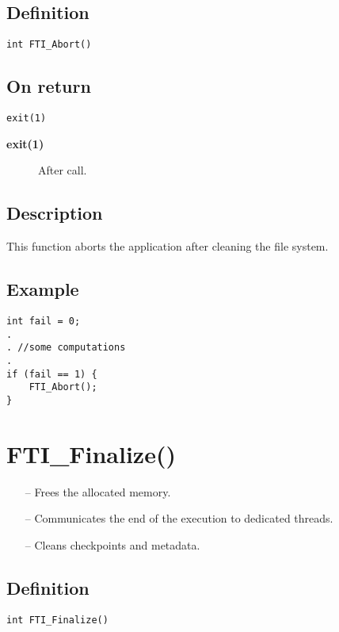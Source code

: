 \documentclass{refrep}
\begin{document}
\subsection*{Definition}
\begin{lstlisting}[frame=single]
int FTI_Abort()
\end{lstlisting}
\subsection*{On return}
\begin{lstlisting}[frame=single]
exit(1)
\end{lstlisting}
\begin{description}
\item[\textbf{exit(1)}] After call.
\end{description}
\subsection*{Description}
This function aborts the application after cleaning the file system.
\subsection*{Example}
\begin{center}
\begin{lstlisting}[frame=single]
int fail = 0;
.
. //some computations
.
if (fail == 1) {
    FTI_Abort();
}
\end{lstlisting}
\end{center}
\newpage
\section{\asciifamily FTI\_Finalize()}\label{sec:ftifinalize}
\begin{framed}
\begin{itemize}
\item[--] Frees the allocated memory.
\item[--] Communicates the end of the execution to dedicated threads.
\item[--] Cleans checkpoints and metadata.
\end{itemize}
\end{framed}
\subsection*{Definition}
\begin{lstlisting}[frame=single]
int FTI_Finalize()
\end{lstlisting}
\end{document}

